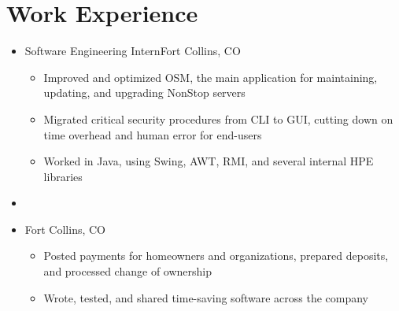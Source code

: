 \documentclass[10pt,letterpaper,sans]{moderncv}
\renewcommand{\_}{\textscale{.7}{\textunderscore}}
\begin{document}
\section{Work Experience}
\begin{itemize}
\item{
  {Software Engineering Intern}{Fort Collins, CO}{}{
    \begin{itemize}
    \item Improved and optimized OSM, the main application for maintaining, updating,
      and upgrading NonStop servers
    \item Migrated critical security procedures from CLI to GUI, cutting down on time
      overhead and human error for end-users
    \item Worked in Java, using Swing, AWT, RMI, and several internal HPE libraries
    \end{itemize}
}}
\item{}
\item{
  {Fort Collins, CO}{}{
    \begin{itemize}
    \item Posted payments for homeowners and organizations, prepared deposits,
      and processed change of ownership
    \item Wrote, tested, and shared time-saving software across the company
    \end{itemize}
}}
\end{itemize}
\end{document}
